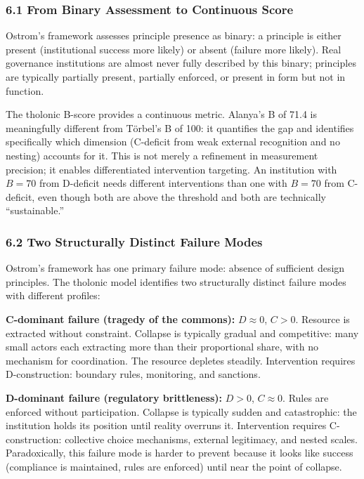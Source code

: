 \documentclass[
  11pt,
  letterpaper,
]{article}
\begin{document}
\subsubsection{6.1 From Binary Assessment to Continuous
Score}\label{from-binary-assessment-to-continuous-score}

Ostrom's framework assesses principle presence as binary: a principle is
either present (institutional success more likely) or absent (failure
more likely). Real governance institutions are almost never fully
described by this binary; principles are typically partially present,
partially enforced, or present in form but not in function.

The tholonic B-score provides a continuous metric. Alanya's B of 71.4 is
meaningfully different from Törbel's B of 100: it quantifies the gap and
identifies specifically which dimension (C-deficit from weak external
recognition and no nesting) accounts for it. This is not merely a
refinement in measurement precision; it enables differentiated
intervention targeting. An institution with \(B = 70\) from D-deficit
needs different interventions than one with \(B = 70\) from C-deficit,
even though both are above the threshold and both are technically
``sustainable.''

\subsubsection{6.2 Two Structurally Distinct Failure
Modes}\label{two-structurally-distinct-failure-modes}

Ostrom's framework has one primary failure mode: absence of sufficient
design principles. The tholonic model identifies two structurally
distinct failure modes with different profiles:

\textbf{C-dominant failure (tragedy of the commons):} \(D \approx 0\),
\(C > 0\). Resource is extracted without constraint. Collapse is
typically gradual and competitive: many small actors each extracting
more than their proportional share, with no mechanism for coordination.
The resource depletes steadily. Intervention requires D-construction:
boundary rules, monitoring, and sanctions.

\textbf{D-dominant failure (regulatory brittleness):} \(D > 0\),
\(C \approx 0\). Rules are enforced without participation. Collapse is
typically sudden and catastrophic: the institution holds its position
until reality overruns it. Intervention requires C-construction:
collective choice mechanisms, external legitimacy, and nested scales.
Paradoxically, this failure mode is harder to prevent because it looks
like success (compliance is maintained, rules are enforced) until near
the point of collapse.
\end{document}

